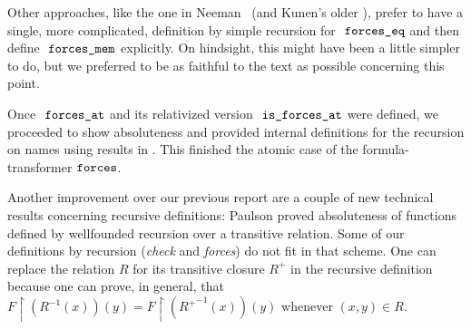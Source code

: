 Other approaches, like the one in Neeman~\cite{neeman-course} (and
Kunen's older \cite{kunen1980}), prefer
to have a single, more complicated, definition by simple recursion for
$\forceseq$ and then define $\forcesmem$ explicitly. On hindsight,
this might have been a little simpler to do, but we preferred to be as
faithful to the text as possible concerning this point.

Once $\forcesat$ and its relativized version $\isatt{is{\isacharunderscore}forces{\isacharunderscore}at}$
were defined, we proceeded to show absoluteness and provided internal
definitions for the recursion on names using results in
. This finished the atomic case of the
formula-transformer $\mathop{\mathtt{forces}}$. 

Another improvement over our previous report are a couple of new
technical results concerning recursive definitions: Paulson proved
absoluteness of functions defined by wellfounded recursion over a
transitive relation. Some of our definitions by recursion
(\emph{check} and \emph{forces}) do not fit in that scheme.  One can
replace the relation $R$ for its transitive closure $R^+$ in the
recursive definition because one can prove, in general, that
$F\!\upharpoonright\!(R^{-1}(x))(y) =
F\!\upharpoonright\!({R^+}^{-1}(x))(y)$ whenever $(x,y) \in R$.


